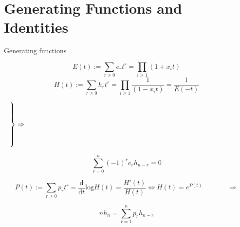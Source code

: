 \documentclass[12pt]{amsart}
\begin{document}
\section{Generating Functions and Identities}
\vspace{-10pt}\begin{mdframed}[linecolor=red!20, linewidth=3pt, innertopmargin=8pt]
	\begin{minipage}[t]{11.5cm}
		\begin{bf}Generating functions\end{bf}
		\begin{equation}E(t):=\sum_{r\geq 0}e_rt^r=\prod_{i\geq 1}(1+x_it)
		\end{equation} 
		\begin{equation}H(t):=\sum_{r\geq 0}h_rt^r=\prod_{i\geq 1}\frac{1}{(1-x_it)}=\frac{1}{E(-t)}
		\end{equation}
	\end{minipage}
	\begin{minipage}[t]{1.5cm}
		\vspace{7pt}$\left.\begin{tikzpicture}
		\node(!) at (0,0){};
		\node(2) at (0,1){};
		\end{tikzpicture} \right\}\Rightarrow$
	\end{minipage}
	\begin{minipage}[t]{8cm}
		\vspace{18pt}\begin{equation} \sum_{r=0}^n (-1)^re_rh_{n-r}=0
		\end{equation}
	\end{minipage}

	\begin{minipage}[t]{13cm}
		\begin{equation}\label{gen P->H} P(t):=\sum_{r\geq 0}p_rt^r=\frac{\textrm{d}}{\textrm{d}t}\textrm{log}H(t)=\frac{H'(t)}{H(t)}		\Leftrightarrow H(t)=e^{P(t)} \hspace{44pt}\Rightarrow
		\end{equation}
	\end{minipage}
	\begin{minipage}[t]{6cm}
		\vspace{-3pt}\begin{equation} nh_n=\sum_{r=1}^n p_rh_{n-r}
		\end{equation}
	\end{minipage}


\end{mdframed}
\end{document}
